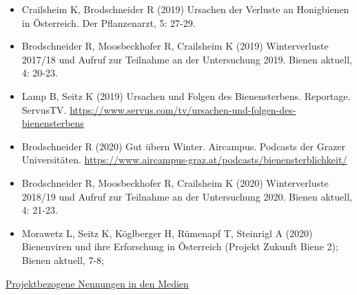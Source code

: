 \begin{itemize}

    \item
    Crailsheim K, Brodschneider R (2019) Ursachen der Verluste an Honigbienen in Österreich. Der Pflanzenarzt, 5: 27-29.

    \item
    Brodschneider R, Moosbeckhofer R, Crailsheim K (2019) Winterverluste 2017/18 und Aufruf zur Teilnahme an der Untersuchung 2019. Bienen aktuell, 4: 20-23.

    \item
    Lamp B, Seitz K (2019) Ursachen und Folgen des Bienensterbens. Reportage. ServusTV. \url{https://www.servus.com/tv/ursachen-und-folgen-des-bienensterbens}
    
    \item
    Brodschneider R (2020) Gut übern Winter. Aircampus. Podcasts der Grazer Universitäten. \url{https://www.aircampus-graz.at/podcasts/bienensterblichkeit/}
    
    \item
    Brodschneider R, Moosbeckhofer R, Crailsheim K (2020) Winterverluste 2018/19 und Aufruf zur Teilnahme an der Untersuchung 2020. Bienen aktuell, 4: 21-23.
    
    \item
    Morawetz L, Seitz K, Köglberger H, Rümenapf T, Steinrigl A (2020) Bienenviren und ihre Erforschung in Österreich (Projekt Zukunft Biene 2); Bienen aktuell, 7-8; 

\end{itemize}

\underline{Projektbezogene Nennungen in den Medien}

